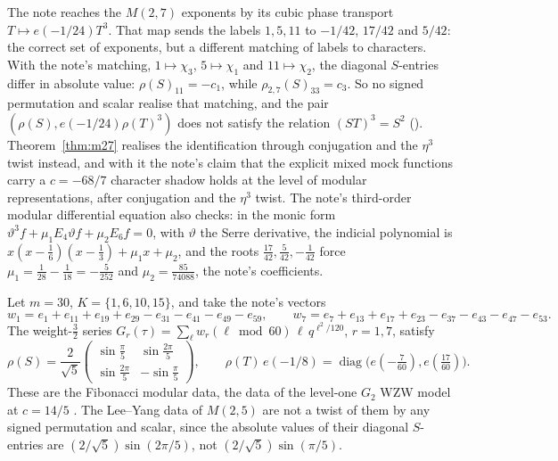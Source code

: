 The note reaches the $M(2,7)$ exponents by its cubic phase transport $T\mapsto e(-1/24)T^3$. That map sends the labels $1,5,11$ to $-1/42$, $17/42$ and $5/42$: the correct set of exponents, but a different matching of labels to characters. With the note's matching, $1\mapsto\chi_3$, $5\mapsto\chi_1$ and $11\mapsto\chi_2$, the diagonal $S$-entries differ in absolute value: $\rho(S)_{11}=-c_1$, while $\rho_{2,7}(S)_{33}=c_3$. So no signed permutation and scalar realise that matching, and the pair $(\rho(S),e(-1/24)\rho(T)^3)$ does not satisfy the relation $(ST)^3=S^2$ (). Theorem~\ref{thm:m27} realises the identification through conjugation and the $\eta^3$ twist instead, and with it the note's claim that the explicit mixed mock functions carry a $c=-68/7$ character shadow holds at the level of modular representations, after conjugation and the $\eta^3$ twist. The note's third-order modular differential equation also checks: in the monic form $\vartheta^3f+\mu_1E_4\vartheta f+\mu_2E_6f=0$, with $\vartheta$ the Serre derivative, the indicial polynomial is $x(x-\tfrac16)(x-\tfrac13)+\mu_1x+\mu_2$, and the roots $\tfrac{17}{42},\tfrac5{42},-\tfrac1{42}$ force $\mu_1=\tfrac1{28}-\tfrac1{18}=-\tfrac5{252}$ and $\mu_2=\tfrac{85}{74088}$, the note's coefficients.

\begin{proposition}\label{prop:fibonacci}
Let $m=30$, $K=\{1,6,10,15\}$, and take the note's vectors
\[
w_1=e_1+e_{11}+e_{19}+e_{29}-e_{31}-e_{41}-e_{49}-e_{59},\qquad w_7=e_7+e_{13}+e_{17}+e_{23}-e_{37}-e_{43}-e_{47}-e_{53}.
\]
The weight-$\tfrac32$ series $G_r(\tau)=\sum_\ell w_r(\ell\bmod60)\,\ell\,q^{\ell^2/120}$, $r=1,7$, satisfy
\[
\rho(S)=\frac2{\sqrt5}\begin{pmatrix}\sin\frac\pi5&\sin\frac{2\pi}5\\ \sin\frac{2\pi}5&-\sin\frac\pi5\end{pmatrix},\qquad \rho(T)\,e(-1/8)=\operatorname{diag}\bigl(e(-\tfrac7{60}),e(\tfrac{17}{60})\bigr).
\]
These are the Fibonacci modular data, the data of the level-one $G_2$ WZW model at $c=14/5$ \cite{RSW}. The Lee--Yang data of $M(2,5)$ are not a twist of them by any signed permutation and scalar, since the absolute values of their diagonal $S$-entries are $(2/\sqrt5)\sin(2\pi/5)$, not $(2/\sqrt5)\sin(\pi/5)$.
\end{proposition}

